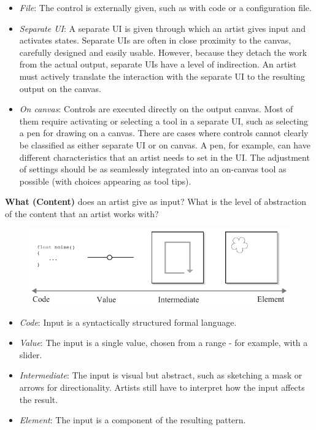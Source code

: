 \begin{itemize}
    \item \textit{File}: The control is externally given, such as with code or a configuration file.
    \item \textit{Separate UI}: A separate UI is given through which an artist gives input and activates states. Separate UIs are often in close proximity to the canvas, carefully designed and easily usable. However, because they detach the work from the actual output, separate UIs have a level of indirection. 
    An artist must actively translate the interaction with the separate UI to the resulting output on the canvas.
    \item \textit{On canvas}: Controls are executed directly on the output canvas. Most of them require activating or selecting a tool in a separate UI, such as selecting a pen for drawing on a canvas. 
    There are cases where controls cannot clearly be classified as either separate UI or on canvas. A pen, for example, can have different characteristics that an artist needs to set in the UI. The adjustment of settings should be as seamlessly integrated into an on-canvas tool as possible (\eg with choices appearing as tool tips). 
\end{itemize}


\noindent\textbf{What (Content)} does an artist give as input? What is the level of abstraction of the content that an artist works with?
\begin{figure}[H]
    \centering
        \includegraphics[width=\controlParamsFigWidth\linewidth]{figures/control_paradigms/what.pdf}
\end{figure}

\begin{itemize}
    \item \textit{Code}: Input is a syntactically structured formal language.
    \item \textit{Value}: The input is a single value, chosen from a range - for example, with a slider.
    \item \textit{Intermediate}: The input is visual but abstract, such as sketching a mask or arrows for directionality. Artists still have to interpret how the input affects the result.
    \item \textit{Element}: The input is a component of the resulting pattern.
\end{itemize}


